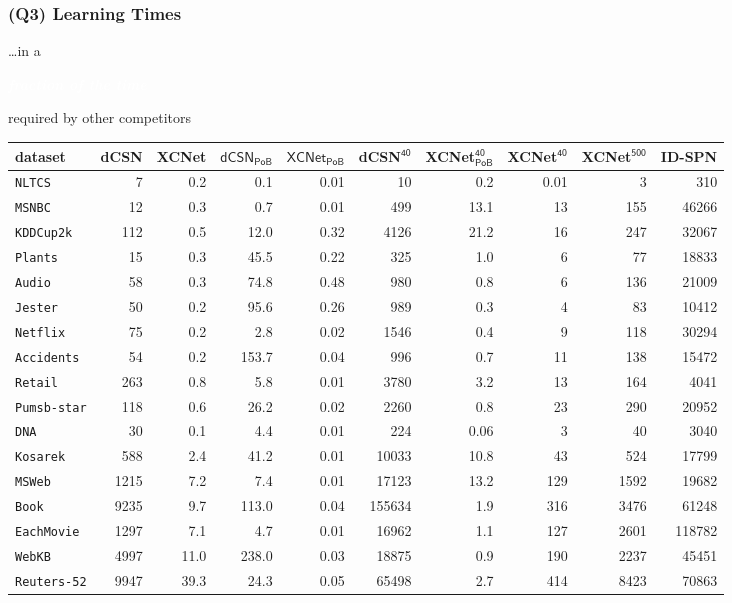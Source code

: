 \documentclass[xcolor={usenames,dvipsnames,svgnames}, compress]{beamer}
\newcommand{\highlighttext}[2][yellow]{{\colorbox{#1}{\strut\textcolor{white}{#2}}}}
\begin{document}
\begin{frame}[t]
  \frametitle{(Q3) Learning Times}

  \scriptsize
\dots in a  \highlighttext[gold4]{\emph{\textbf{fraction of the time}}}
  required by other competitors\vspace{-10pt}
  \begin{table}[t]
  \centering
  \setlength{\tabcolsep}{1pt}  
\tiny
  \begin{tabular}{l rrr r r r r r r}
    dataset           & \textsf{dCSN} & \textsf{XCNet} & $\mathsf{dCSN_{PoB}}$ &
    $\mathsf{XCNet_{PoB}}$ &\textsf{dCSN$^{\mathsf{40}}$} & \textsf{XCNet$^{\mathsf{40}}_\mathsf{PoB}$}& \textsf{XCNet$^{\mathsf{40}}$} & \textsf{XCNet$^{\mathsf{500}}$} & \textsf{ID-SPN}\\
    \midrule
    \texttt{NLTCS}& 7&0.2&0.1	&0.01&10&0.2& 0.01 & 3 &310\\ 
    \texttt{MSNBC} & 12&0.3&0.7&	0.01&499&13.1& 13 & 155 &46266\\ 
    \texttt{KDDCup2k}&112&0.5&12.0&0.32&4126&21.2& 16& 247 &32067\\ 
    \texttt{Plants}&15&0.3&45.5	&0.22&325&1.0& 6 & 77 &18833\\ 
    \texttt{Audio} & 58&0.3&74.8&0.48&980&0.8&6 &136 &21009\\ 
    \texttt{Jester}&50&0.2&95.6&	0.26&989&0.3&4 & 83 &10412\\ 
    \texttt{Netflix}&75&0.2&2.8&	0.02&1546&0.4& 9& 118&30294\\ 
    \texttt{Accidents}&54&0.2&153.7	&0.04&996&0.7& 11& 138 &15472\\ 
    \texttt{Retail}&263&0.8&5.8	&0.01&3780&3.2& 13 & 164&4041\\ 
    \texttt{Pumsb-star}&118&0.6&26.2&	0.02&2260&0.8& 23 & 290 &20952\\ 
    \texttt{DNA}&30&0.1&4.4&	0.01&224&0.06& 3& 40 &3040\\ 
    \texttt{Kosarek}&588&2.4&41.2&	0.01&10033&10.8& 43 &524 &17799\\ 
    \texttt{MSWeb}&1215&7.2&7.4	&0.01&17123&13.2& 129 & 1592 &19682\\ 
    \texttt{Book}&9235&9.7&113.0	&0.04&155634&1.9& 316& 3476&61248\\ 
    \texttt{EachMovie}&1297&7.1&4.7	&0.01&16962&1.1& 127 & 2601&118782\\ 
    \texttt{WebKB}&4997&11.0&238.0&	0.03&18875&0.9& 190 & 2237 &45451\\ 
    \texttt{Reuters-52}&9947&39.3&24.3&	0.05&65498&2.7& 414 & 8423 &70863\\ 

\end{tabular}
\end{table}
\end{frame}
\end{document}
